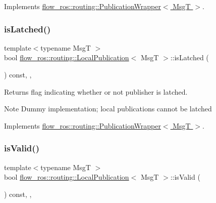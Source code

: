 Implements \hyperlink{classflow__ros_1_1routing_1_1_publication_wrapper_a0398202c79a6bdb1ff57acc8c730bc65}{flow\+\_\+ros\+::routing\+::\+Publication\+Wrapper$<$ Msg\+T $>$}.

\mbox{\label{classflow__ros_1_1routing_1_1_local_publication_ad1b48ed20ccdab599389f3132f545dd8}} 
\subsubsection{\texorpdfstring{is\+Latched()}{isLatched()}}
{\footnotesize\ttfamily template$<$typename MsgT $>$ \\
bool \hyperlink{classflow__ros_1_1routing_1_1_local_publication}{flow\+\_\+ros\+::routing\+::\+Local\+Publication}$<$ MsgT $>$\+::is\+Latched (\begin{DoxyParamCaption}{ }\end{DoxyParamCaption}) const\hspace{0.3cm}{\ttfamily [inline]}, {\ttfamily [override]}, {\ttfamily [virtual]}}



Returns flag indicating whether or not publisher is latched. 

\begin{DoxyNote}{Note}
Dummy implementation; local publications cannot be latched 
\end{DoxyNote}


Implements \hyperlink{classflow__ros_1_1routing_1_1_publication_wrapper_a86fdc857e02347e862dbbb113e5a6cb6}{flow\+\_\+ros\+::routing\+::\+Publication\+Wrapper$<$ Msg\+T $>$}.

\mbox{\label{classflow__ros_1_1routing_1_1_local_publication_a982359da6513c94f5befd4e990796c28}} 
\subsubsection{\texorpdfstring{is\+Valid()}{isValid()}}
{\footnotesize\ttfamily template$<$typename MsgT $>$ \\
bool \hyperlink{classflow__ros_1_1routing_1_1_local_publication}{flow\+\_\+ros\+::routing\+::\+Local\+Publication}$<$ MsgT $>$\+::is\+Valid (\begin{DoxyParamCaption}{ }\end{DoxyParamCaption}) const\hspace{0.3cm}{\ttfamily [inline]}, {\ttfamily [override]}, {\ttfamily [virtual]}}







